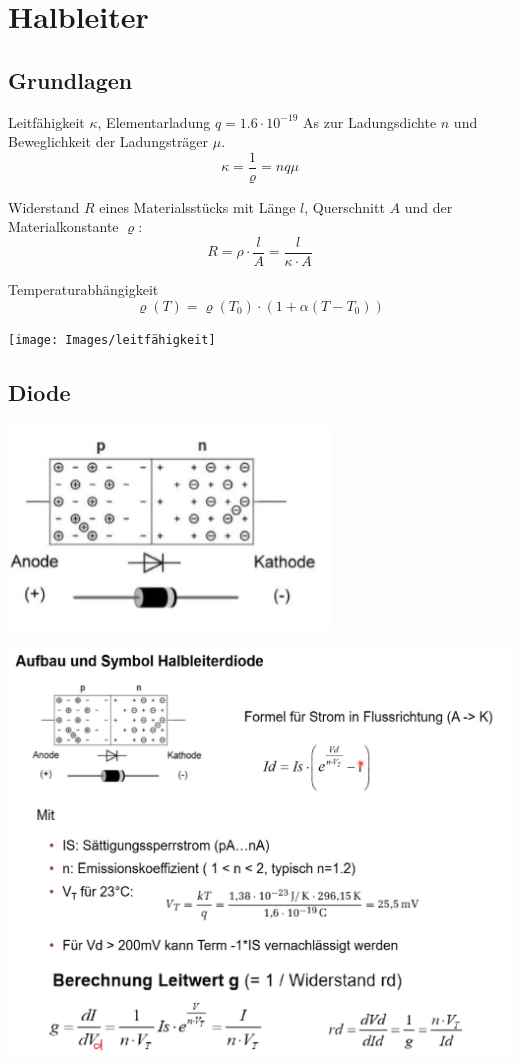 \section{Halbleiter}
\subsection{Grundlagen}
Leitfähigkeit $\kappa$, Elementarladung $q = 1.6\cdot10^{-19}$ As zur Ladungsdichte $n$ und Beweglichkeit der Ladungsträger $\mu$.
\[
\kappa = \frac{1}{\varrho} = nq\mu
\]

Widerstand $R$ eines Materialsstücks mit Länge $l$, Querschnitt $A$ und der Materialkonstante $\varrho$:
\[
R = \rho \cdot \frac{l}{A} = \frac{l}{\kappa \cdot A}
\]

Temperaturabhängigkeit
\[
\varrho(T) = \varrho(T_0) \cdot (1 + \alpha(T - T_0))
\]

\texttt{[image: Images/leitfähigkeit]}

\subsection{Diode}
\includegraphics[width=0.4\columnwidth]{Images/diode_grafik}

\includegraphics[width=\columnwidth]{Images/diode}

